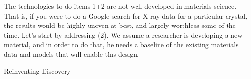 The technologies to do items 1+2 are not well developed in materials science. That is, if you were to do a Google search for X-ray data for a particular crystal, the results would be highly uneven at best, and largely worthless some of the time.  Let’s start by addressing (2).  We assume a researcher is developing a new material, and in order to do that, he needs a baseline of the existing materials data and models that will enable this design.  

\cite{Warren_2012}
\cite{OECD}
\cite{Ward_2014}
\cite{Nielsen_2011}{Reinventing Discovery}
